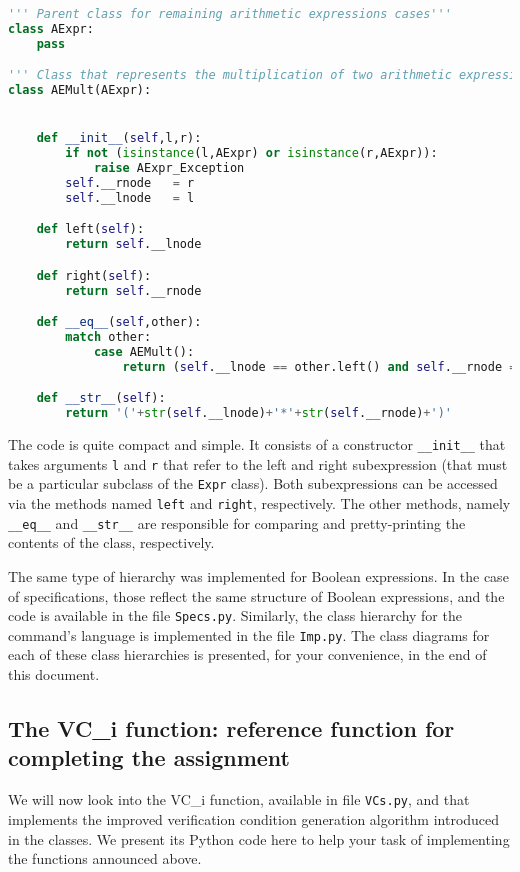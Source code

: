 \documentclass[11pt]{article}
\begin{document}
\begin{lstlisting}[language=Python]
''' Parent class for remaining arithmetic expressions cases'''
class AExpr:
    pass

''' Class that represents the multiplication of two arithmetic expressions.'''
class AEMult(AExpr):


    def __init__(self,l,r):
        if not (isinstance(l,AExpr) or isinstance(r,AExpr)):
            raise AExpr_Exception
        self.__rnode   = r
        self.__lnode   = l

    def left(self):
        return self.__lnode

    def right(self):
        return self.__rnode

    def __eq__(self,other):
        match other:
            case AEMult():
                return (self.__lnode == other.left() and self.__rnode == other.right())

    def __str__(self):
        return '('+str(self.__lnode)+'*'+str(self.__rnode)+')'  
\end{lstlisting}
The code is quite compact and simple. It consists of a constructor \lstinline!__init__! that takes arguments \lstinline!l! and \lstinline!r! that refer to the left and right subexpression (that must be a particular subclass of the \lstinline!Expr! class). Both subexpressions can be accessed via the methods named \lstinline!left! and \lstinline!right!, respectively. The other methods, namely \lstinline!__eq__! and \lstinline!__str__! are responsible for comparing and pretty-printing the contents of the class, respectively.


The same type of hierarchy was implemented for Boolean expressions. In the case of specifications, those reflect the same structure of Boolean expressions, and the code is available in the file \texttt{Specs.py}. Similarly, the class hierarchy for the command's language is implemented in the file \texttt{Imp.py}. The class diagrams for each of these class hierarchies is presented, for your convenience, in the end of this document.

\subsection{The VC\_i function: reference function for completing the assignment}

We will now look into the VC\_i function, available in file \texttt{VCs.py}, and that implements the improved verification condition generation algorithm introduced in the classes. We present its Python code here to help your task of implementing the functions announced above.
\end{document}
